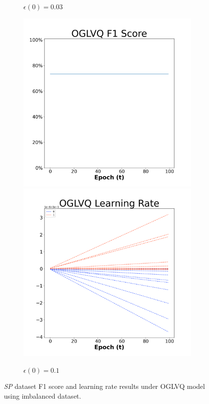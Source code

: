 \begin{figure}[H]
\begin{subfigure}{0.3\textwidth}
\caption{$\epsilon(0)=0.03$}
\end{subfigure}\hfil %
\begin{subfigure}{0.3\textwidth}
\includegraphics[width=\linewidth]{images/exper2/SP/OGLVQ_0.1_f1.png}
\includegraphics[width=\linewidth]{images/exper2/SP/OGLVQ_0.1_lr.png}
\caption{$\epsilon(0)=0.1$}
\end{subfigure}

\caption{\textit{SP} dataset F1 score and learning rate results under OGLVQ model using imbalanced dataset.}
\end{figure}


